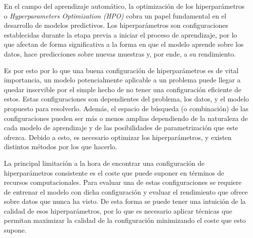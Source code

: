 En el campo del aprendizaje automático, la optimización de los hiperparámetros o \textit{Hyperparameters Optimization (HPO)} cobra un papel fundamental en el desarrollo de modelos predictivos. Los hiperparámetros son configuraciones establecidas durante la etapa previa a iniciar el proceso de aprendizaje, por lo que afectan de forma significativa a la forma en que el modelo aprende sobre los datos, hace predicciones sobre nuevas muestras y, por ende, a su rendimiento.

Es por esto por lo que una buena configuración de hiperparámetros es de vital importancia, un modelo potencialmente aplicable a un problema puede llegar a quedar inservible por el simple hecho de no tener una configuración eficiente de estos. Estas configuraciones son dependientes del problema, los datos, y el modelo propuesto para resolverlo. Además, el espacio de búsqueda (o combinación) de las configuraciones pueden ser más o menos amplias dependiendo de la naturaleza de cada modelo de aprendizaje y de las posibilidades de parametrización que este ofrezca. Debido a esto, es necesario optimizar los hiperparámetros, y existen distintos métodos por los que hacerlo.

La principal limitación a la hora de encontrar una configuración de hiperparámetros consistente es el coste que puede suponer en términos de recursos computacionales. Para evaluar una de estas configuraciones se requiere de entrenar el modelo con dicha configuración y evaluar el rendimiento que ofrece sobre datos que nunca ha visto. De esta forma se puede tener una intuición de la calidad de esos hiperparámetros, por lo que es necesario aplicar técnicas que permitan maximizar la calidad de la configuración minimizando el coste que esto supone.



